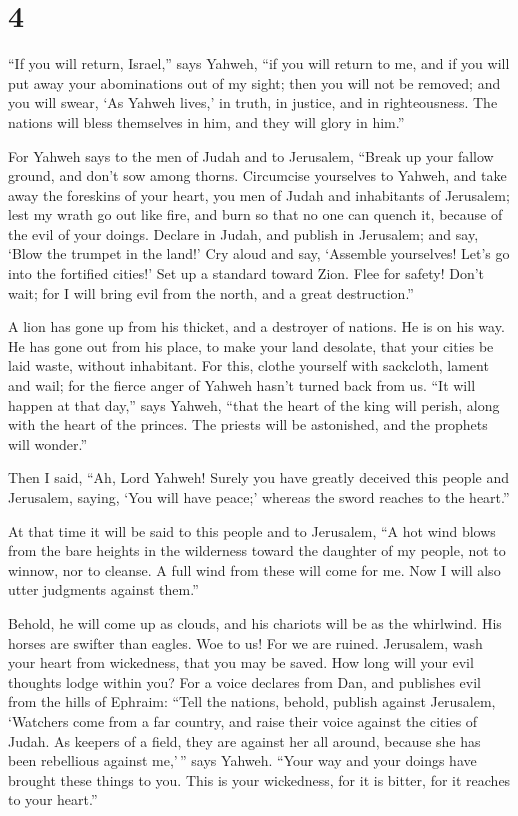 \hypertarget{section-3}{%
\section{4}\label{section-3}}

 ``If you will return, Israel,'' says Yahweh, ``if you will
return to me, and if you will put away your abominations out of my
sight; then you will not be removed;  and you will swear,
`As Yahweh lives,' in truth, in justice, and in righteousness. The
nations will bless themselves in him, and they will glory in him.''

 For Yahweh says to the men of Judah and to Jerusalem,
``Break up your fallow ground, and don't sow among thorns. 
Circumcise yourselves to Yahweh, and take away the foreskins of your
heart, you men of Judah and inhabitants of Jerusalem; lest my wrath go
out like fire, and burn so that no one can quench it, because of the
evil of your doings.  Declare in Judah, and publish in
Jerusalem; and say, `Blow the trumpet in the land!' Cry aloud and say,
`Assemble yourselves! Let's go into the fortified cities!' 
Set up a standard toward Zion. Flee for safety! Don't wait; for I will
bring evil from the north, and a great destruction.''

 A lion has gone up from his thicket, and a destroyer of
nations. He is on his way. He has gone out from his place, to make your
land desolate, that your cities be laid waste, without inhabitant.
 For this, clothe yourself with sackcloth, lament and wail;
for the fierce anger of Yahweh hasn't turned back from us. 
``It will happen at that day,'' says Yahweh, ``that the heart of the
king will perish, along with the heart of the princes. The priests will
be astonished, and the prophets will wonder.''

 Then I said, ``Ah, Lord Yahweh! Surely you have greatly
deceived this people and Jerusalem, saying, `You will have peace;'
whereas the sword reaches to the heart.''

 At that time it will be said to this people and to
Jerusalem, ``A hot wind blows from the bare heights in the wilderness
toward the daughter of my people, not to winnow, nor to cleanse.
 A full wind from these will come for me. Now I will also
utter judgments against them.''

 Behold, he will come up as clouds, and his chariots will
be as the whirlwind. His horses are swifter than eagles. Woe to us! For
we are ruined.  Jerusalem, wash your heart from wickedness,
that you may be saved. How long will your evil thoughts lodge within
you?  For a voice declares from Dan, and publishes evil
from the hills of Ephraim:  ``Tell the nations, behold,
publish against Jerusalem, `Watchers come from a far country, and raise
their voice against the cities of Judah.  As keepers of a
field, they are against her all around, because she has been rebellious
against me,'\,'' says Yahweh.  ``Your way and your doings
have brought these things to you. This is your wickedness, for it is
bitter, for it reaches to your heart.''

